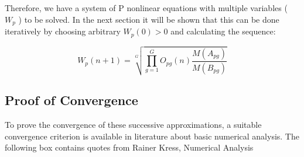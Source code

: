 \documentclass[a4paper]{article}
\begin{document}
Therefore, we have a system of P nonlinear equations with multiple variables ( $ W_p $ ) to be solved. 
In the next section it will be shown that this can be done iteratively by choosing arbitrary
$ W_p(0) > 0 $ and calculating the sequence:

\begin{equation}
W_p(n+1) = \sqrt[G]{\displaystyle\prod_{g=1}^{G}{O_{pg}(n)\frac{M(A_{pg})}{M(B_{pg})}}}
\end{equation} 

\pagebreak


\subsection*{Proof of Convergence}

To prove the convergence of these successive approximations, a suitable convergence criterion is available in
literature about basic numerical analysis. The following box contains quotes from Rainer Kress, Numerical Analysis \cite[p.98ff]{NumAna}
\small
\end{document}

